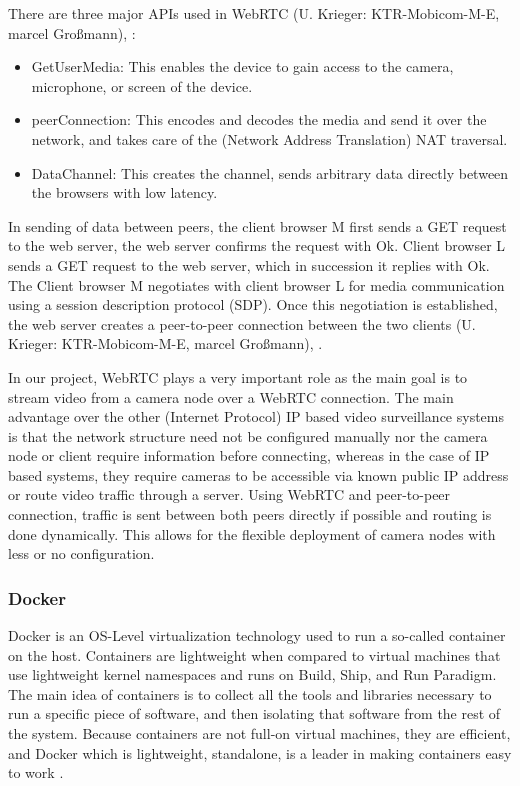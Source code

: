 There are three major APIs used in WebRTC (U. Krieger: KTR-Mobicom-M-E, marcel Großmann), \cite{webrtc}:
\begin{itemize}
	\item GetUserMedia: This enables the device to gain access to the camera, microphone, or screen of the device.
	\item peerConnection: This encodes and decodes the media and send it over the network, and takes care of the (Network Address Translation) NAT traversal.
	\item DataChannel: This creates the channel, sends  arbitrary data directly between the browsers with low latency. 
\end{itemize}

In sending of data between peers, the client browser M first sends a GET request to the web server, the web server confirms the request with Ok. Client browser L sends a GET request to the web server, which in succession it replies with Ok. The Client browser M negotiates with client browser L for media communication using a session description protocol (SDP). Once this negotiation is established, the web server creates a peer-to-peer connection between the two clients (U. Krieger: KTR-Mobicom-M-E, marcel Großmann), \cite{webrtc}. \par

In our project, WebRTC plays a very important role as the main goal is to stream video from a camera node over a WebRTC connection. The main advantage over the other (Internet Protocol) IP based video surveillance systems is that the network structure need not be configured manually nor the camera node or client require information before connecting, whereas in the case of IP based systems, they require cameras to be accessible via known public IP address or route video traffic through a server. Using WebRTC and peer-to-peer connection, traffic is sent between both peers directly if possible and routing is done dynamically. This allows for the flexible deployment of camera nodes with less or no configuration.

\subsubsection{Docker}
Docker is an OS-Level virtualization technology used to run a so-called container on the host. Containers are lightweight when compared to virtual machines that use lightweight kernel namespaces and runs on Build, Ship, and Run Paradigm. The main idea of containers is to collect all the tools and libraries necessary to run a specific piece of software, and then isolating that software from the rest of the system. Because containers are not full-on virtual machines, they are efficient, and Docker which is lightweight, standalone, is a leader in making containers easy to work \cite{8}. \par

